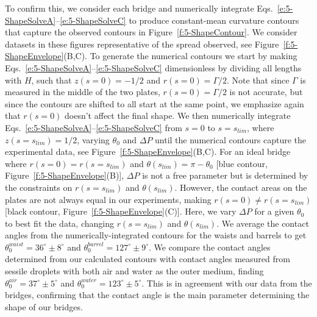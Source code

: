 To confirm this, we consider each bridge and numerically integrate Eqs.~\ref{e:5-ShapeSolveA}--\ref{e:5-ShapeSolveC} to produce constant-mean curvature contours that capture the observed contours in Figure~\ref{f:5-ShapeContour}.
We consider datasets in these figures representative of the spread observed, see Figure~\ref{f:5-ShapeEnvelope}(B,C).
To generate the numerical contours we start by making Eqs.~\ref{e:5-ShapeSolveA}--\ref{e:5-ShapeSolveC} dimensionless by dividing all lengths with $H$, such that $z(s = 0) = -1/2$ and $r(s = 0) = \Gamma/2$.
Note that since $\Gamma$ is measured in the middle of the two plates, $r(s = 0) = \Gamma/2$ is not accurate, but since the contours are shifted to all start at the same point, we emphasize again that $r(s = 0)$ doesn't affect the final shape.
We then numerically integrate Eqs.~\ref{e:5-ShapeSolveA}--\ref{e:5-ShapeSolveC} from $s = 0$ to $s = s_{lim}$, where $z(s = s_{lim}) = 1/2$, varying $\theta_0$ and $\Delta P$ until the numerical contours capture the experimental data, see Figure~\ref{f:5-ShapeEnvelope}(B,C).
For an ideal bridge where $r(s = 0) = r(s = s_{lim})$ and $\theta(s_{lim}) = \pi - \theta_0$ [blue contour, Figure~\ref{f:5-ShapeEnvelope}(B)], $\Delta P$ is not a free parameter but is determined by the constraints on $r(s = s_{lim})$ and $\theta(s_{lim})$.
However, the contact areas on the plates are not always equal in our experiments, making $r(s = 0) \neq r(s = s_{lim})$ [black contour, Figure~\ref{f:5-ShapeEnvelope}(C)].
Here, we vary $\Delta P$ for a given $\theta_0$ to best fit the data, changing $r(s = s_{lim})$ and $\theta(s_{lim})$.
We average the contact angles from the numerically-integrated contours for the waists and barrels to get $\theta^{waist}_0 = 36^{\circ} \pm 8^{\circ}$ and $\theta^{barrel}_0 = 127^{\circ} \pm 9^{\circ}$.
We compare the contact angles determined from our calculated contours with contact angles measured from sessile droplets with both air and water as the outer medium, finding $\theta_0^{air} = 37^{\circ} \pm 5^{\circ}$ and $\theta_0^{water} = 123^{\circ} \pm 5^{\circ}$.
This is in agreement with our data from the bridges, confirming that the contact angle is the main parameter determining the shape of our bridges.




